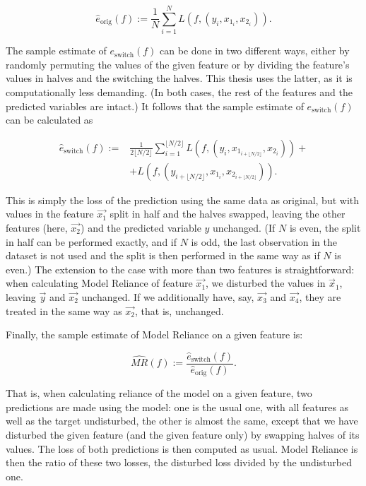 			\begin{equation*}
				\hat{e}_{\text{orig}}(f):= \frac{1}{N} \sum_{i=1}^{N} L\left(f, (y_i, x_{1_i}, x_{2_i}) \right).
			\end{equation*} 
			
			The sample estimate of $e_{\text{switch}}(f)$ can be done in two different ways, either by randomly permuting the values of the given feature or by dividing the feature's values in halves and the switching the halves. This thesis uses the latter, as it is computationally less demanding. (In both cases, the rest of the features and the predicted variables are intact.) It follows that the sample estimate of $e_{\text{switch}}(f)$ can be calculated as
			
			
			\begin{equation*}
				\begin{split}
					\hat{e}_{\text{switch}}(f):= & \frac{1}{2 \lfloor N/2 \rfloor} \sum_{i=1}^{\lfloor N/2 \rfloor} L \left(f, \left( y_i, x_{1_{i+\lfloor N/2 \rfloor}}, x_{2_{i}} \right) \right) + \\ 
					& + L \left( f, \left(y_{i+\lfloor N/2 \rfloor}, x_{1_{i}}, x_{2_{i+\lfloor N/2 \rfloor}} \right) \right). 
				\end{split}
			\end{equation*}
			
			This is simply the loss of the prediction using the same data as original, but with values in the feature $\vec{x_1}$ split in half and the halves swapped, leaving the other features (here, $\vec{x_2}$) and the predicted variable $y$ unchanged. (If $N$ is even, the split in half can be performed exactly, and if $N$ is odd, the last observation in the dataset is not used and the split is then performed in the same way as if $N$ is even.) The extension to the case with more than two features is straightforward: when calculating Model Reliance of feature $\vec{x_1}$, we disturbed the values in $\vec{x}_1$, leaving $\vec{y}$ and $\vec{x_2}$ unchanged. If we additionally have, say, $\vec{x_3}$ and $\vec{x_4}$, they are treated in the same way as $\vec{x_2}$, that is, unchanged. 
			
			Finally, the sample estimate of Model Reliance on a given feature is: 
			
			\begin{equation*}
				\widehat{MR}(f):=\frac{\hat{e}_{\text{switch}}(f)}{\hat{e}_{\text{orig}}(f)}.
			\end{equation*}
				
			That is, when calculating reliance of the model on a given feature, two predictions are made using the model: one is the usual one, with all features as well as the target undisturbed, the other is almost the same, except that we have disturbed the given feature (and the given feature only) by swapping halves of its values. The loss of both predictions is then computed as usual. Model Reliance is then the ratio of these two losses, the disturbed loss divided by the undisturbed one.   
			

